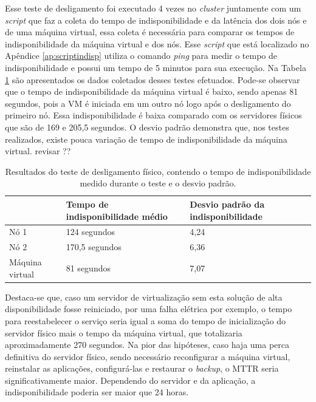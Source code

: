 Esse teste de desligamento foi executado 4 vezes no \textit{cluster} juntamente com um \textit{script} que faz a coleta do tempo de
indisponibilidade e da latência dos dois nós e de uma máquina virtual, essa coleta é necessária para comparar os tempos de indisponibilidade da
máquina virtual e dos nós. 
Esse \textit{script} que está localizado no Apêndice \ref{ap:scriptindisp} utiliza o comando \textit{ping} para medir o tempo de indisponibilidade 
e possui um tempo de 5 minutos para sua execução. Na Tabela \ref{tab:teste1resultados} são apresentados os dados coletados desses testes efetuados. 
Pode-se observar que o tempo de indisponibilidade da máquina virtual é baixo, sendo apenas 81 segundos, pois a \ac{VM} é iniciada em um outro 
nó logo após o desligamento do primeiro nó. Essa indisponibilidade é baixa comparado com os servidores físicos que são de 169 e 205,5 segundos. 
O desvio padrão demonstra que, nos testes realizados, existe pouca variação de tempo de indisponibilidade da máquina virtual.
revisar ??


\begin{table}[h!]
\caption{Resultados do teste de desligamento físico, contendo o tempo de indisponibilidade medido durante o teste e o desvio padrão.}
\label{tab:teste1resultados}
\begin{center}
\begin{tabular}{|l|l|l|}\hline
 & \textbf{Tempo de indisponibilidade médio} & \textbf{Desvio padrão da indisponibilidade} \\\hline
Nó 1 & 124 segundos & 4,24 \\\hline
Nó 2 & 170,5 segundos & 6,36 \\\hline
Máquina virtual & 81 segundos & 7,07 \\\hline
\end{tabular}
\end{center}
\end{table}

Destaca-se que, caso um servidor de virtualização sem esta solução de alta disponibilidade fosse reiniciado, por uma falha elétrica por exemplo, 
o tempo para reestabelecer o serviço seria igual a soma do tempo de inicialização do servidor físico mais o tempo da máquina virtual, 
que totalizaria aproximadamente 270 segundos. 
Na pior das hipóteses, caso haja uma perca definitiva do servidor físico, sendo necessário reconfigurar a máquina virtual, reinstalar as aplicações,
configurá-las e restaurar o \textit{backup}, o \ac{MTTR} seria significativamente maior. Dependendo do servidor e da aplicação, 
a indisponibilidade poderia ser maior que 24 horas.


